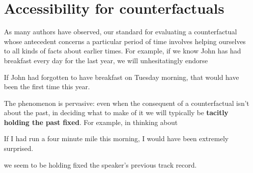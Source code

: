 \documentclass[If.tex]{subfiles}
\begin{document}










\section{Accessibility for counterfactuals}\label{sect:cf}
As many authors have observed, our standard for evaluating a counterfactual whose antecedent concerns a particular period of time involves helping ourselves to all kinds of facts about earlier times. For example, if we know John has had breakfast every day for the last year, we will unhesitatingly endorse
\begin{prop}
	\nitem \label{breakfast}
		If John had forgotten to have breakfast on Tuesday morning, that would have been the first time this year.
\end{prop}
The phenomenon is pervasive: even when the consequent of a counterfactual isn't about the past, in deciding what to make of it we will typically be \textbf{tacitly holding the past fixed}. For example, in thinking about
\begin{prop}
	\nitem 
		If I had run a four minute mile this morning, I would have been extremely surprised.
\end{prop}
we seem to be holding fixed the speaker's previous track record.
\end{document}
